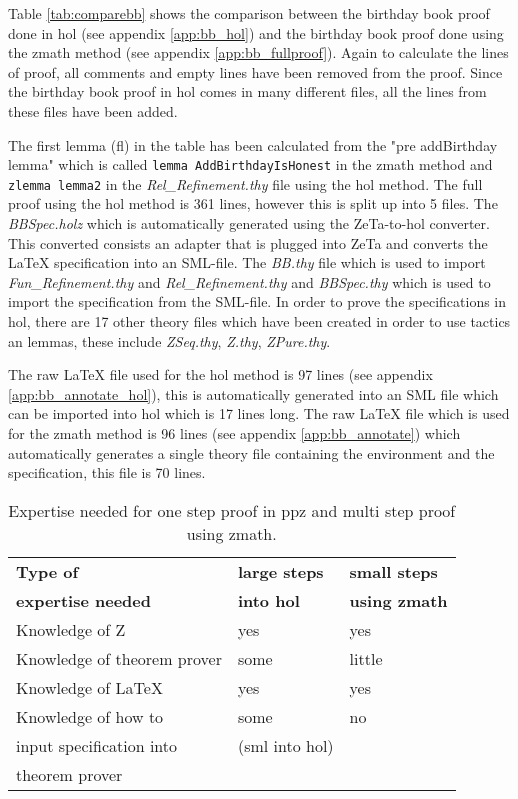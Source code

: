Table \ref{tab:comparebb} shows the comparison between the birthday book proof done in \gls{hol} (see appendix \ref{app:bb_hol}) and the birthday book proof done using the \gls{zmath} method (see appendix \ref{app:bb_fullproof}). Again to calculate the lines of proof, all comments and empty lines have been removed from the proof. Since the birthday book proof in \gls{hol} comes in many different files, all the lines from these files have been added.

The first lemma (fl) in the table has been calculated from the "pre addBirthday lemma" which is called \texttt{lemma AddBirthdayIsHonest} in the \gls{zmath} method and \texttt{zlemma lemma2} in the \emph{Rel\_Refinement.thy} file using the \gls{hol} method. The full proof using the \gls{hol} method is 361 lines, however this is split up into 5 files. The \emph{BBSpec.holz} which is automatically generated using the ZeTa-to-\gls{hol} converter. This converted consists an adapter that is plugged into ZeTa and converts the \LaTeX{} specification into an SML-file. The \emph{BB.thy} file which is used to import \emph{Fun\_Refinement.thy} and \emph{Rel\_Refinement.thy} and \emph{BBSpec.thy} which is used to import the specification from the SML-file. In order to prove the specifications in \gls{hol}, there are 17 other theory files which have been created in order to use tactics an lemmas, these include \emph{ZSeq.thy}, \emph{Z.thy}, \emph{ZPure.thy}.

The raw \LaTeX{} file used for the \gls{hol} method is 97 lines (see appendix \ref{app:bb_annotate_hol}), this is automatically generated into an SML file which can be imported into \gls{hol} which is 17 lines long. The raw \LaTeX{} file which is used for the \gls{zmath} method is 96 lines (see appendix \ref{app:bb_annotate}) which automatically generates a single theory file containing the environment and the specification, this file is 70 lines.

\begin{table}[H]
\begin{center}
\begin{tabular}{| l | l | l |}
\hline
\textbf{Type of} & \textbf{large steps} & \textbf{small steps} \\
\textbf{expertise needed} & \textbf{into \gls{hol}} & \textbf{using \gls{zmath}} \\
\hline
\hline
Knowledge of Z &  yes & yes \\
\hline
Knowledge of theorem prover & some & little \\
\hline
Knowledge of \LaTeX & yes & yes \\
\hline
Knowledge of how to & some & no \\
input specification into &(sml into \gls{hol})&  \\
theorem prover &  &  \\
\hline
\end{tabular}
\end{center}
\caption{Expertise needed for one step proof in \gls{ppz} and multi step proof using \gls{zmath}.}
\label{tab:expertisebb}
\end{table}

